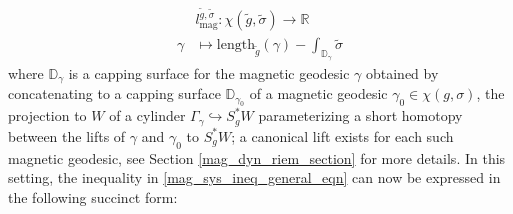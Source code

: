 \documentclass[11pt]{amsart}
\theoremstyle{plain}
\theoremstyle{definition}
\theoremstyle{remark}
\begin{document}
\begin{align}\label{mag_length_functional_def}
    &l_{\text{mag}}^{\tilde g,\tilde \sigma}: \chi(\tilde g,\tilde \sigma) \rightarrow \mathbb{R}\\\nonumber
    \gamma &\mapsto \text{length}_{\tilde g}(\gamma) - \int_{\mathbb{D}_{\gamma}} \tilde\sigma
\end{align}
where $\mathbb{D}_{\gamma}$ is a capping surface for the magnetic geodesic $\gamma$ obtained by concatenating to a capping surface $\mathbb{D}_{\gamma_0}$ of a magnetic geodesic $\gamma_0 \in \chi(g,\sigma)$, the projection to $W$ of a cylinder $\Gamma_{\gamma} \hookrightarrow S^*_gW$ parameterizing a short homotopy between the lifts of $\gamma$ and $\gamma_0$ to $S^*_gW$; a canonical lift exists for each such magnetic geodesic, see Section \ref{mag_dyn_riem_section} for more details. In this setting, the inequality in \eqref{mag_sys_ineq_general_eqn} can now be expressed in the following succinct form:
\end{document}
